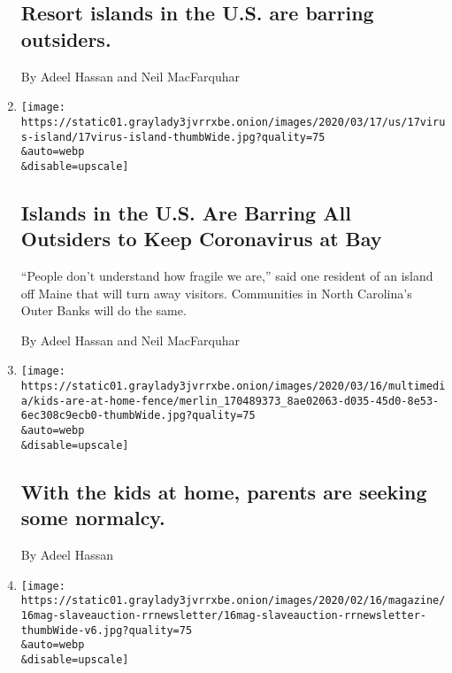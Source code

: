 \begin{enumerate}
  \hypertarget{resort-islands-in-the-us-are-barring-outsiders}{%
  \subsection{Resort islands in the U.S. are barring
  outsiders.}\label{resort-islands-in-the-us-are-barring-outsiders}}

  By Adeel Hassan and Neil MacFarquhar
\item
  \href{/2020/03/17/us/north-carolina-and-maine-coronavirus.html}{}

  \texttt{[image: https://static01.graylady3jvrrxbe.onion/images/2020/03/17/us/17virus-island/17virus-island-thumbWide.jpg?quality=75\\\&auto=webp\\\&disable=upscale]}

  \hypertarget{islands-in-the-us-are-barring-all-outsiders-to-keep-coronavirus-at-bay}{%
  \subsection{Islands in the U.S. Are Barring All Outsiders to Keep
  Coronavirus at
  Bay}\label{islands-in-the-us-are-barring-all-outsiders-to-keep-coronavirus-at-bay}}

  ``People don't understand how fragile we are,'' said one resident of
  an island off Maine that will turn away visitors. Communities in North
  Carolina's Outer Banks will do the same.

  By Adeel Hassan and Neil MacFarquhar
\item
  \href{/live/2020/coronavirus-usa-03-16/with-the-kids-at-home-parents-are-seeking-some-normalcy}{}

  \texttt{[image: https://static01.graylady3jvrrxbe.onion/images/2020/03/16/multimedia/kids-are-at-home-fence/merlin\_170489373\_8ae02063-d035-45d0-8e53-6ec308c9ecb0-thumbWide.jpg?quality=75\\\&auto=webp\\\&disable=upscale]}

  \hypertarget{with-the-kids-at-home-parents-are-seeking-some-normalcy}{%
  \subsection{With the kids at home, parents are seeking some
  normalcy.}\label{with-the-kids-at-home-parents-are-seeking-some-normalcy}}

  By Adeel Hassan
\item
  \href{/2020/02/29/us/the-hidden-history-of-slavery-that-surrounds-us.html}{}

  \texttt{[image: https://static01.graylady3jvrrxbe.onion/images/2020/02/16/magazine/16mag-slaveauction-rrnewsletter/16mag-slaveauction-rrnewsletter-thumbWide-v6.jpg?quality=75\\\&auto=webp\\\&disable=upscale]}


\end{enumerate}
